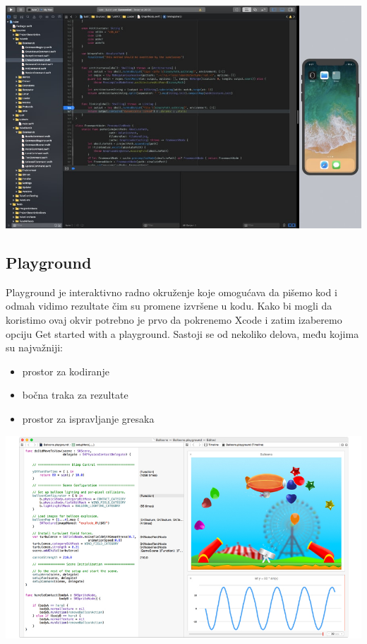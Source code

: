 \documentclass[a4paper]{article}
\begin{document}
\includegraphics[scale=0.2]{xcode.jpg}


\subsection{Playground}
\label{subsec:podnaslovPlayground}
\vspace{3mm}


Playground je interaktivno radno okruženje koje omogućava da pišemo kod i odmah vidimo
rezultate čim su promene izvršene u kodu. Kako bi mogli da koristimo ovaj okvir potrebno je prvo
da pokrenemo Xcode i zatim izaberemo opciju Get started with a playground.
Sastoji se od nekoliko delova, među kojima su najvažniji: 
\begin{itemize}
\item prostor za kodiranje
\item bočna traka za rezultate
\item prostor za ispravljanje gresaka
\end{itemize}
\vspace{3mm}


\includegraphics[scale=0.2]{playground.jpg}
\end{document}
